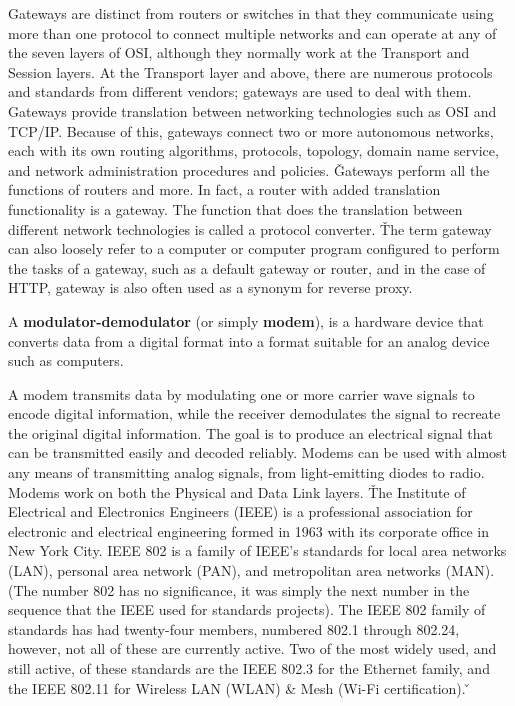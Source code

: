 
Gateways are distinct from routers or switches in that they communicate using more than one protocol to connect
multiple networks and can operate at any of the seven layers of OSI, although they normally work at the Transport and
Session layers. At the Transport layer and above, there are numerous protocols and standards from different vendors;
gateways are used to deal with them. Gateways provide translation between networking technologies such as OSI and
TCP/IP. Because of this, gateways connect two or more autonomous networks, each with its own routing algorithms,
protocols, topology, domain name service, and network administration procedures and policies. \v

Gateways perform all the functions of routers and more. In fact, a router with added translation functionality is a
gateway. The function that does the translation between different network technologies is called a protocol converter. \v

The term gateway can also loosely refer to a computer or computer program configured to perform the tasks of a
gateway, such as a default gateway or router, and in the case of HTTP, gateway is also often used as a synonym for
reverse proxy.

\bd[Modem]
A \textbf{modulator-demodulator} (or simply \textbf{modem}), is a hardware device that converts data from a digital
format into a format suitable for an analog device such as computers.
\ed


A modem transmits data by modulating one or more carrier wave signals to encode digital information, while the
receiver demodulates the signal to recreate the original digital information. The goal is to produce an electrical
signal that can be transmitted easily and decoded reliably. Modems can be used with almost any means of transmitting
analog signals, from light-emitting diodes to radio. Modems work on both the Physical and Data Link layers. \v

The Institute of Electrical and Electronics Engineers (IEEE) is a professional association for electronic and
electrical engineering formed in 1963 with its corporate office in New York City. IEEE 802 is a family of IEEE's
standards for local area networks (LAN), personal area network (PAN), and metropolitan area networks (MAN). (The
number 802 has no significance, it was simply the next number in the sequence that the IEEE used for standards
projects). The IEEE 802 family of standards has had twenty-four members, numbered 802.1 through 802.24, however, not
all of these are currently active. Two of the most widely used, and still active, of these standards are the IEEE 802.3
for the Ethernet family, and the IEEE 802.11 for Wireless LAN (WLAN) \& Mesh (Wi-Fi certification). \v

